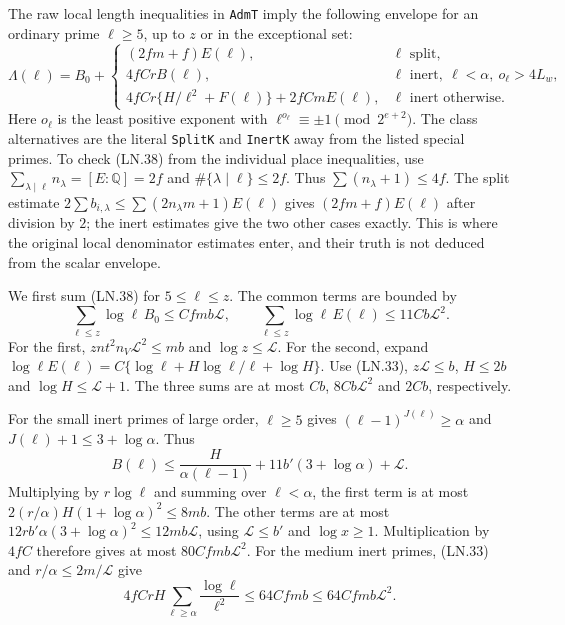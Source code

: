 The raw local length inequalities in \texttt{AdmT} imply the
following envelope for an ordinary prime $\ell\ge5$, up to $z$
or in the exceptional set:
\[
 \Lambda(\ell)=B_0+
 \begin{cases}
 (2fm+f)E(\ell),&\ell\text{ split},\\
 4fCrB(\ell),&\ell\text{ inert},\ \ell<\alpha,\ o_\ell>4L_w,\\
 4fCr\{H/\ell^2+F(\ell)\}+2fCmE(\ell),
                    &\ell\text{ inert otherwise}.
 \end{cases}                                                   \tag{LN.38}
\]
Here $o_\ell$ is the least positive exponent with
$\ell^{o_\ell}\equiv\pm1\pmod{2^{e+2}}$.  The class alternatives
are the literal \texttt{SplitK} and \texttt{InertK} away from the
listed special primes.  To check (LN.38) from the individual place
inequalities, use
$\sum_{\lambda\mid\ell}n_\lambda=[E:\mathbb Q]=2f$ and
$\#\{\lambda\mid\ell\}\le2f$.  Thus
$\sum(n_\lambda+1)\le4f$.  The split estimate
$2\sum b_{i,\lambda}\le\sum(2n_\lambda m+1)E(\ell)$ gives
$(2fm+f)E(\ell)$ after division by $2$; the inert estimates give
the two other cases exactly.  This is where the original local
denominator estimates enter, and their truth is not deduced from
the scalar envelope.

We first sum (LN.38) for $5\le\ell\le z$.
The common terms are bounded by
\[
 \sum_{\ell\le z}\log\ell\, B_0\le Cfmb\mathcal L,
 \qquad \sum_{\ell\le z}\log\ell\, E(\ell)
                                      \le11Cb\mathcal L^2.
 \tag{LN.39}
\]
For the first, $znt^2n_V\mathcal L^2\le mb$ and
$\log z\le\mathcal L$.  For the second, expand
$\log\ell E(\ell)=C\{\log\ell+H\log\ell/\ell+\log H\}$.
Use (LN.33), $z\mathcal L\le b$, $H\le2b$ and
$\log H\le\mathcal L+1$.  The three sums are at most
$Cb$, $8Cb\mathcal L^2$ and $2Cb$, respectively.

For the small inert primes of large order, $\ell\ge5$ gives
$(\ell-1)^{J(\ell)}\ge\alpha$ and
$J(\ell)+1\le3+\log\alpha$.  Thus
\[
 B(\ell)\le\frac H{\alpha(\ell-1)}
                      +11b'(3+\log\alpha)+\mathcal L.
 \tag{LN.40}
\]
Multiplying by $r\log\ell$ and summing over $\ell<\alpha$,
the first term is at most
$2(r/\alpha)H(1+\log\alpha)^2\le8mb$.
The other terms are at most
$12rb'\alpha(3+\log\alpha)^2\le12mb\mathcal L$, using
$\mathcal L\le b'$ and $\log x\ge1$.
Multiplication by $4fC$ therefore gives at most
$80Cfmb\mathcal L^2$.
For the medium inert primes, (LN.33) and $r/\alpha\le2m/\mathcal L$
give
\[
 4fCrH\sum_{\ell\ge\alpha}\frac{\log\ell}{\ell^2}
      \le64Cfmb\le64Cfmb\mathcal L^2.                 \tag{LN.41}
\]

